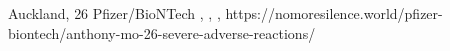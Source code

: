           {
            Auckland, 
          }
          {
            26
          }
          {
            Pfizer/BioNTech
          }
          {
          }
          {
            ,
            ,
            ,
          }
          {
            https://nomoresilence.world/pfizer-biontech/anthony-mo-26-severe-adverse-reactions/
          }

